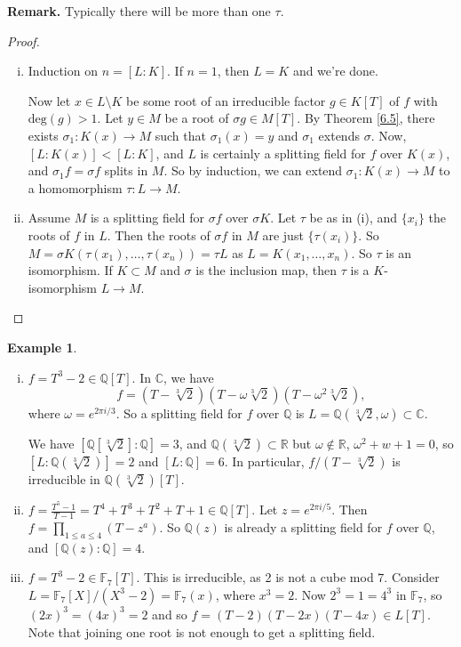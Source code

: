 \documentclass{article}
\theoremstyle{definition}
\newtheorem{example}{Example}[section]
\begin{document}
\textbf{Remark.} Typically there will be more than one $\tau$.

\begin{proof}
    \begin{enumerate}[(i)]
        \item Induction on $n = [L:K]$. If $n=1$, then $L=K$ and we're done.
        
        Now let $x \in L \setminus K$ be some root of an irreducible factor $g \in K[T]$ of $f$ with $\text{deg}(g)>1$. Let $y \in M$ be a root of $\sigma g \in M[T]$. By Theorem \ref{6.5}, there exists $\sigma_1 : K(x) \to M$ such that $\sigma_1(x) = y$ and $\sigma_1$ extends $\sigma.$ Now, $[L : K(x)] < [L : K]$, and $L$ is certainly a splitting field for $f$ over $K(x)$, and $\sigma_1 f =\sigma f$ splits in $M$. So by induction, we can extend $\sigma_1 : K(x) \to M$ to a homomorphism $\tau : L \to M$.
        \item Assume $M$ is a splitting field for $\sigma f$ over $\sigma K$. Let $\tau$ be as in (i), and $\{x_i\}$ the roots of $f$ in $L$. Then the roots of $\sigma f$ in $M$ are just $\{\tau(x_i)\}$. So $M = \sigma K (\tau(x_1),\ldots,\tau(x_n)) = \tau L$ as $L = K(x_1,\ldots,x_n)$. So $\tau$ is an isomorphism. If $K \subset M$ and $\sigma$ is the inclusion map, then $\tau$ is a $K$-isomorphism $L \to M$. 
    \end{enumerate}
\end{proof}
\begin{example}
    \begin{enumerate}[(i)]
        \item $f = T^3-2 \in \mathbb{Q}[T]$. In $\mathbb{C}$, we have $$f=(T-\sqrt[3]{2})(T-\omega \sqrt[3]{2})(T-\omega^2\sqrt[3]{2}),$$ where $\omega = e^{2 \pi i /3}$. So a splitting field for $f$ over $\mathbb{Q}$ is $L=\mathbb{Q}(\sqrt[3]{2}, \omega) \subset \mathbb{C}$. 
        
        We have $[\mathbb{Q}[\sqrt[3]{2}] : \mathbb{Q}] = 3$, and $\mathbb{Q}(\sqrt[3]{2}) \subset \mathbb{R}$ but $\omega \not\in \mathbb{R}$, $\omega^2+w+1=0$, so $[L : \mathbb{Q}(\sqrt[3]{2})] = 2$ and $[L:\mathbb{Q}]=6$. In particular, $f/(T-\sqrt[3]{2})$ is irreducible in $\mathbb{Q}(\sqrt[3]{2})[T].$
        \item $f = \frac{T^5-1}{T-1} = T^4 + T^3+T^2+T+1 \in \mathbb{Q}[T]$. Let $z = e^{2\pi i/5}$. Then $f = \prod_{1\le a\le 4}^{} (T-z^{a})$. So $\mathbb{Q}(z)$ is already a splitting field for $f$ over $\mathbb{Q}$, and $[\mathbb{Q}(z):\mathbb{Q}]=4$.
        \item $f = T^3-2 \in \mathbb{F}_7[T]$. This is irreducible, as 2 is not a cube mod $7$. Consider $L=\mathbb{F}_7[X]/(X^3-2) = \mathbb{F}_7(x)$, where $x^3=2$. Now $2^3=1=4^3$ in $\mathbb{F}_7$, so $(2x)^3=(4x)^3=2$ and so $f = (T-2)(T-2x)(T-4x) \in L[T]$. Note that joining one root is not enough to get a splitting field.
    \end{enumerate}
\end{example}
\end{document}
